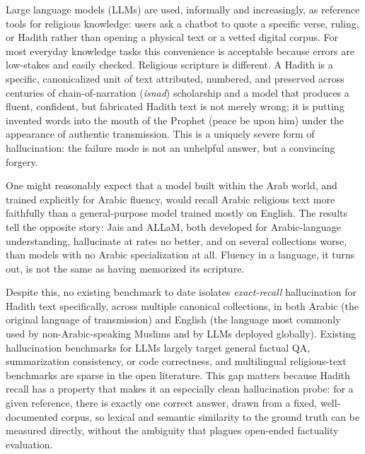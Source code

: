\documentclass{article}
\begin{document}
Large language models (LLMs) are used, informally and increasingly, as
reference tools for religious knowledge: users ask a chatbot to quote a
specific verse, ruling, or Hadith rather than opening a physical text or a
vetted digital corpus. For most everyday knowledge tasks this convenience is
acceptable because errors are low-stakes and easily checked. Religious
scripture is different. A Hadith is a specific, canonicalized unit of
text attributed, numbered, and preserved across centuries of
chain-of-narration (\emph{isnad}) scholarship and a model that produces a
fluent, confident, but fabricated Hadith text is not merely wrong; it is
putting invented words into the mouth of the Prophet (peace be upon him) under
the appearance of authentic transmission. This is a uniquely severe form of
hallucination: the failure mode is not an unhelpful answer, but a convincing
forgery.

One might reasonably expect that a model built within the Arab world, and
trained explicitly for Arabic fluency, would recall Arabic religious text
more faithfully than a general-purpose model trained mostly on English. The
results tell the opposite story: Jais and ALLaM, both developed for
Arabic-language understanding, hallucinate at rates no better, and on
several collections worse, than models with no Arabic specialization at
all. Fluency in a language, it turns out, is not the same as having
memorized its scripture.

Despite this, no existing benchmark to date isolates
\emph{exact-recall} hallucination for Hadith text specifically, across
multiple canonical collections, in both Arabic (the original language of
transmission) and English (the language most commonly used by
non-Arabic-speaking Muslims and by LLMs deployed globally). Existing
hallucination benchmarks for LLMs largely target general factual QA,
summarization consistency, or code correctness, and multilingual
religious-text benchmarks are sparse in the open literature. This gap matters
because Hadith recall has a property that makes it an especially clean
hallucination probe: for a given reference, there is exactly one correct
answer, drawn from a fixed, well-documented corpus, so lexical and semantic
similarity to the ground truth can be measured directly, without the ambiguity
that plagues open-ended factuality evaluation.
\end{document}

